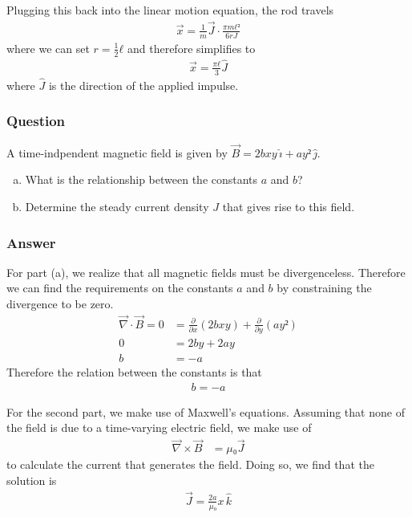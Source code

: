 Plugging this back into the linear motion equation, the rod travels
\begin{align*}
    \vec x = \frac{1}{m} \vec J ⋅ \frac{πmℓ²}{6 rJ}
\end{align*}
where we can set $r = \frac 12 ℓ$ and therefore simplifies to
\begin{align}
    \boxed{
    \vec x = \frac{πℓ}{3} \hat J
    }
\end{align}
where $\hat J$ is the direction of the applied impulse.

\subsubsection{Question}

A time-indpendent magnetic field is given by $\vec B = 2bxy \,\hat ı +
ay² \,\hat ȷ$.
\begin{enumerate}[a)]
    \item
        What is the relationship between the constants $a$ and $b$?
    \item
        Determine the steady current density $J$ that gives rise to this field.
\end{enumerate}

\subsubsection{Answer}
For part (a), we realize that all magnetic fields must be divergenceless.
Therefore we can find the requirements on the constants $a$ and $b$ by
constraining the divergence to be zero.
\begin{align*}
    \vec ∇ ⋅ \vec B = 0 &= \frac{∂}{∂x}(2bxy) + \frac{∂}{∂y}(ay²) \\
    0 &= 2by + 2ay \\
    b &= -a
\end{align*}
Therefore the relation between the constants is that
\begin{align}
    \boxed {b = -a}
\end{align}

For the second part, we make use of Maxwell's equations. Assuming that none of
the field is due to a time-varying electric field, we make use of
\begin{align*}
    \vec ∇ × \vec B &= μ₀ \vec J
\end{align*}
to calculate the current that generates the field. Doing so, we find that the
solution is
\begin{align}
    \boxed{ \vec J = \frac{2a}{μ₀} x \,\hat k }
\end{align}

